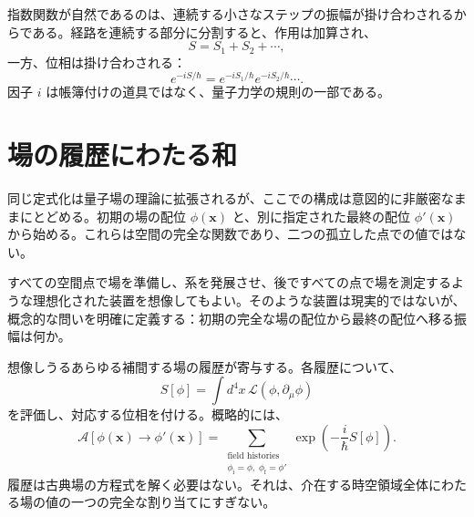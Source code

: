 指数関数が自然であるのは、連続する小さなステップの振幅が掛け合わされるからである。経路を連続する部分に分割すると、作用は加算され、
\begin{equation}
S=S_1+S_2+\cdots,
\end{equation}
一方、位相は掛け合わされる：
\begin{equation}
e^{-iS/\hbar}
=e^{-iS_1/\hbar}e^{-iS_2/\hbar}\cdots.
\end{equation}
因子 \(i\) は帳簿付けの道具ではなく、量子力学の規則の一部である。

\begin{classroomqa}
\end{classroomqa}

\begin{classroomqa}
\end{classroomqa}

\section{場の履歴にわたる和}

同じ定式化は量子場の理論に拡張されるが、ここでの構成は意図的に非厳密なままにとどめる。初期の場の配位 \(\phi(\mathbf{x})\) と、別に指定された最終の配位 \(\phi'(\mathbf{x})\) から始める。これらは空間の完全な関数であり、二つの孤立した点での値ではない。

すべての空間点で場を準備し、系を発展させ、後ですべての点で場を測定するような理想化された装置を想像してもよい。そのような装置は現実的ではないが、概念的な問いを明確に定義する：初期の完全な場の配位から最終の配位へ移る振幅は何か。

想像しうるあらゆる補間する場の履歴が寄与する。各履歴について、
\begin{equation}
S[\phi]=\int d^4x\,\mathcal{L}(\phi,\partial_\mu\phi)
\end{equation}
を評価し、対応する位相を付ける。概略的には、
\begin{equation}
\mathcal{A}\!\left[\phi(\mathbf{x})\rightarrow\phi'(\mathbf{x})\right]
=
\sum_{\substack{\text{field histories}\\
\phi_{\mathrm{i}}=\phi,\;\phi_{\mathrm{f}}=\phi'}}
\exp\!\left(-\frac{i}{\hbar}S[\phi]\right).
\end{equation}
履歴は古典場の方程式を解く必要はない。それは、介在する時空領域全体にわたる場の値の一つの完全な割り当てにすぎない。

